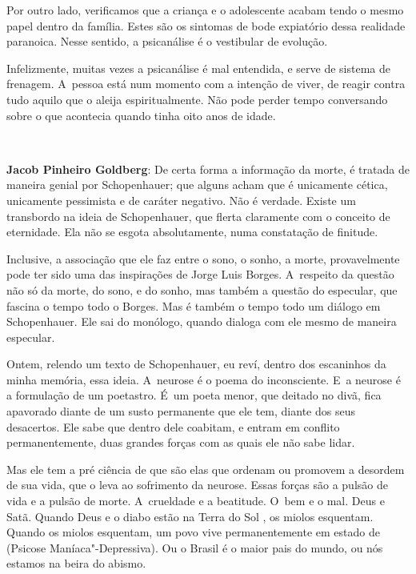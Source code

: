 Por outro lado, verificamos que a criança e o adolescente acabam tendo o
mesmo papel dentro da família. Estes são os sintomas de bode expiatório
dessa realidade paranoica. Nesse sentido, a psicanálise é o vestibular
de evolução.

Infelizmente, muitas vezes a psicanálise é mal entendida, e serve de
sistema de frenagem. A~pessoa está num momento com a intenção de viver,
de reagir contra tudo aquilo que o aleija espiritualmente. Não pode
perder tempo conversando sobre o que acontecia quando tinha oito anos de
idade.

\begin{center}\asterisc{}\ ~\end{center}

\abrefala

\textbf{Jacob Pinheiro Goldberg}: De certa forma a informação da morte,
é tratada de maneira genial por Schopenhauer; que alguns acham que é
unicamente cética, unicamente pessimista e de caráter negativo. Não é
verdade. Existe um transbordo na ideia de Schopenhauer, que flerta
claramente com o conceito de eternidade. Ela não se esgota
absolutamente, numa constatação de finitude.

 

Inclusive, a associação que ele faz entre o sono, o sonho, a morte,
provavelmente pode ter sido uma das inspirações de Jorge Luis Borges. A~respeito da questão não só da morte, do sono, e do sonho, mas também a
questão do especular, que fascina o tempo todo o Borges. Mas é também o
tempo todo um diálogo em Schopenhauer. Ele sai do monólogo, quando
dialoga com ele mesmo de maneira especular.

 

Ontem, relendo um texto de Schopenhauer, eu reví, dentro dos escaninhos
da minha memória, essa ideia. A~neurose é o poema do inconsciente. E~a
neurose é a formulação de um poetastro. É~um poeta menor, que deitado no
divã, fica apavorado diante de um susto permanente que ele tem, diante
dos seus desacertos. Ele sabe que dentro dele coabitam, e entram em
conflito permanentemente, duas grandes forças com as quais ele não sabe
lidar.

 

Mas ele tem a pré ciência de que são elas que ordenam ou promovem a
desordem de sua vida, que o leva ao sofrimento da neurose. Essas forças
são a pulsão de vida e a pulsão de morte. A~crueldade e a beatitude. O~bem e o mal. Deus e Satã. Quando Deus e o diabo estão na Terra do Sol ,
os miolos esquentam. Quando os miolos esquentam, um povo vive
permanentemente em estado de  (Psicose Maníaca"-Depressiva). Ou o
Brasil é o maior pais do mundo, ou nós estamos na beira do abismo.

